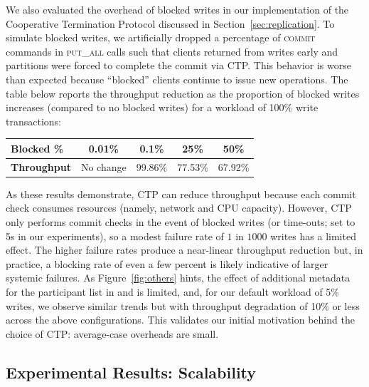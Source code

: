 We also evaluated the overhead of blocked writes in our implementation
of the Cooperative Termination Protocol discussed in
Section~\ref{sec:replication}. To simulate blocked writes, we
artificially dropped a percentage of \textsc{commit} commands in
\textsc{put\_all} calls such that clients returned from writes early
and partitions were forced to complete the commit via CTP. This
behavior is worse than expected because ``blocked'' clients continue
to issue new operations. The table below reports the throughput
reduction as the proportion of blocked writes increases (compared to
no blocked writes) for a workload of 100\% \rapl write
transactions:
\begin{center}
\small 
\begin{tabular}{|l|c|c|c|c|}
\hline
\textbf{Blocked \%} & 0.01\% & 0.1\% & 25\% & 50\% \\\hline
{\textbf{Throughput}} & No change & 99.86\% & 77.53\% & 67.92\% \\\hline
\end{tabular}
\end{center}
As these results demonstrate, CTP can reduce throughput because each
commit check consumes resources (namely, network and CPU
capacity). However, CTP only performs commit checks in the event of
blocked writes (or time-outs; set to 5s in our experiments), so a modest
failure rate of $1$ in $1000$ writes has a limited effect. The higher
failure rates produce a near-linear throughput reduction but, in
practice, a blocking rate of even a few percent is likely indicative
of larger systemic failures. As Figure~\ref{fig:others} hints, the
effect of additional metadata for the participant list in \rapb and
\raps is limited, and, for our default workload of 5\% writes,
we observe similar trends but with throughput degradation of 10\% or
less across the above configurations. This validates our initial motivation
behind the choice of CTP: average-case overheads are small.

\subsection{Experimental Results: Scalability}



